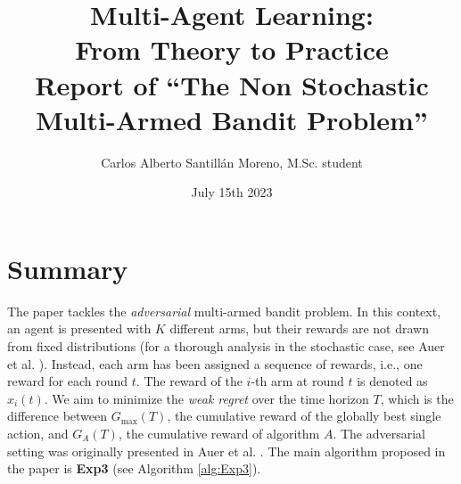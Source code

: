 \documentclass[12pt,a4paper]{article}
\begin{document}
\title{%
Multi-Agent Learning:\\From Theory to Practice \\
	\large Report of \enquote{The Non Stochastic Multi-Armed Bandit Problem}}
\author{Carlos Alberto Santillán Moreno, M.Sc. student}
\date{July 15th 2023}
\maketitle	

\section{Summary}

The paper \cite{j18} tackles the \textit{adversarial} multi-armed bandit problem. In this context, an agent is presented with $K$ different arms, but their rewards are not drawn from fixed distributions (for a thorough analysis in the stochastic case, see Auer et al. \cite{regretstat}). Instead, each arm has been assigned a sequence of rewards, i.e., one reward for each round $t$.  The reward of the $i$-th arm at round $t$ is denoted as $x_i(t)$. We aim to minimize the \textit{weak regret} over the time horizon $T$,  which is the difference between $G_{\max}(T)$, the cumulative reward of the globally best single action, and $G_{A}(T)$, the cumulative reward of algorithm $A$. The adversarial setting was originally presented in Auer et al. \cite{original}. The main algorithm proposed in the paper is \textbf{Exp3} (see Algorithm \ref{alg:Exp3}).
\end{document}
